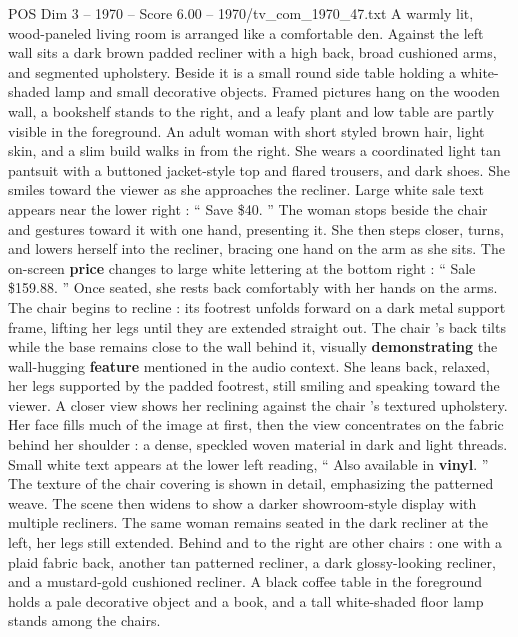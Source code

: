 \begin{textsample}{POS Dim 3 – 1970 – Score 6.00 – 1970/tv\_com\_1970\_47.txt}  \label{ex:f3_pos_039}
A warmly lit, wood-paneled living room is arranged like a comfortable den.
Against the left wall sits a dark brown padded recliner with a high back, broad cushioned arms, and segmented upholstery.
Beside it is a small round side table holding a white-shaded lamp and small decorative objects.
Framed pictures hang on the wooden wall, a bookshelf stands to the right, and a leafy plant and low table are partly visible in the foreground.
An adult woman with short styled brown hair, light skin, and a slim build walks in from the right.
She wears a coordinated light tan pantsuit with a buttoned jacket-style top and flared trousers, and dark shoes.
She smiles toward the viewer as she approaches the recliner.
Large white sale text appears near the lower right : “ Save \$40. ” The woman stops beside the chair and gestures toward it with one hand, presenting it.
She then steps closer, turns, and lowers herself into the recliner, bracing one hand on the arm as she sits.
The on-screen \textbf{price} changes to large white lettering at the bottom right : “ Sale \$159.88. ” Once seated, she rests back comfortably with her hands on the arms.
The chair begins to recline : its footrest unfolds forward on a dark metal support frame, lifting her legs until they are extended straight out.
The chair ’s back tilts while the base remains close to the wall behind it, visually \textbf{demonstrating} the wall-hugging \textbf{feature} mentioned in the audio context.
She leans back, relaxed, her legs supported by the padded footrest, still smiling and speaking toward the viewer.
A closer view shows her reclining against the chair ’s textured upholstery.
Her face fills much of the image at first, then the view concentrates on the fabric behind her shoulder : a dense, speckled woven material in dark and light threads.
Small white text appears at the lower left reading, “ Also available in \textbf{vinyl}. ” The texture of the chair covering is shown in detail, emphasizing the patterned weave.
The scene then widens to show a darker showroom-style display with multiple recliners.
The same woman remains seated in the dark recliner at the left, her legs still extended.
Behind and to the right are other chairs : one with a plaid fabric back, another tan patterned recliner, a dark glossy-looking recliner, and a mustard-gold cushioned recliner.
A black coffee table in the foreground holds a pale decorative object and a book, and a tall white-shaded floor lamp stands among the chairs.

\end{textsample}
